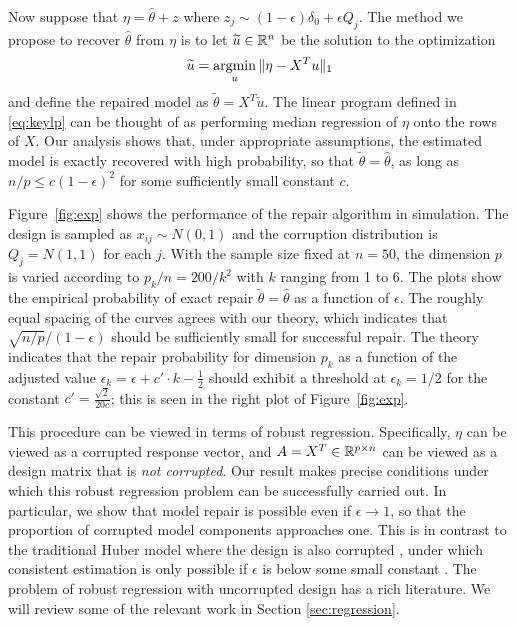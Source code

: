 Now suppose that $\eta = \hat\theta + z$ where $z_j \sim (1-\epsilon) \delta_0 + \epsilon Q_j$. The method we propose to recover $\hat\theta$ from $\eta$ is to let $\widetilde u\in\mathbb{R}^n$ be the solution to the optimization
\begin{equation}
  \tilde u = \argmin_u \| \eta  - X^T u\|_1
  \label{eq:keylp}
\end{equation}
and define the repaired model as $\tilde\theta = X^T\tilde u$.
The linear program defined in \eqref{eq:keylp} can be thought of as performing median regression of $\eta$ onto the rows of $X$.
Our analysis shows that, under appropriate assumptions, the estimated model is exactly recovered with high probability, so that $\tilde \theta = \hat\theta$, as long as $n/p \leq c(1-\epsilon)^2$ for some sufficiently small constant $c$.

Figure~\ref{fig:exp} shows the performance of
the repair algorithm in simulation. The design is sampled as $x_{ij} \sim N(0,1)$ and the corruption distribution is $Q_j = N(1,1)$ for each $j$. With the sample size fixed at $n=50$, the dimension $p$ is varied according to $p_k/n=200/k^2$ with
$k$ ranging from 1 to 6. The plots show the empirical probability of exact repair $\tilde\theta = \hat\theta$ as a function of $\epsilon$. The roughly equal spacing of the curves agrees with our theory, which indicates that $\sqrt{n/p}/(1-\epsilon)$ should be sufficiently small for successful repair. The theory indicates that the repair probability for dimension $p_k$ as a function of the adjusted value $\epsilon_k = \epsilon + c'\cdot k - \frac{1}{2}$ should exhibit a threshold at
$\epsilon_k = 1/2$ for the constant $c' = \frac{\sqrt{2}}{20 c}$; this is seen in the right plot of Figure~\ref{fig:exp}.



 This procedure can be viewed in terms of robust regression. Specifically, $\eta$ can be viewed as a corrupted response vector, and $A = X^T \in \mathbb{R}^{p\times n}$ can be viewed as a design matrix that is \textit{not corrupted}.  Our result makes precise conditions under which this robust regression problem can be successfully carried out.
In particular, we show that model repair is possible even if $\epsilon \to 1$, so that the proportion of corrupted model components approaches one. This is in contrast to the traditional Huber model where the design is also corrupted \citep{huber:64}, under which consistent estimation is only possible if $\epsilon$ is below some small constant \citep{chen2016,gao2020}. The problem of robust regression with uncorrupted design has a rich literature. We will review some of the relevant work in Section \ref{sec:regression}.


